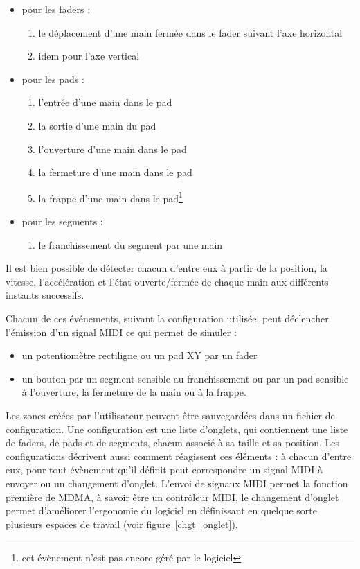 \begin{itemize}
    \item pour les faders :
        \begin{enumerate}
            \item le déplacement d'une main fermée dans le fader suivant l'axe horizontal
            \item idem pour l'axe vertical
        \end{enumerate}
    \item pour les pads :
        \begin{enumerate}
            \item l'entrée d'une main dans le pad
            \item la sortie d'une main du pad
            \item l'ouverture d'une main dans le pad
            \item la fermeture d'une main dans le pad
            \item la frappe d'une main dans le pad\footnote{cet évènement n'est pas encore géré par le logiciel}
        \end{enumerate}
    \item pour les segments :
        \begin{enumerate}
            \item le franchissement du segment par une main
        \end{enumerate}
\end{itemize}
\par Il est bien possible de détecter chacun d'entre eux à partir de la position, la vitesse, l'accélération et l'état ouverte/fermée de chaque main aux différents instants successifs.
\par Chacun de ces événements, suivant la configuration utilisée, peut déclencher l'émission d'un signal MIDI ce qui permet de simuler :
\begin{itemize}
    \item un potentiomètre rectiligne ou un pad XY par un fader
    \item un bouton par un segment sensible au franchissement ou par un pad sensible à l'ouverture, la fermeture de la main ou à la frappe.
\end{itemize}
\par Les zones créées par l'utilisateur peuvent être sauvegardées dans un fichier de configuration. Une configuration est une liste d'onglets, qui contiennent une liste de faders, de pads et de segments, chacun associé à sa taille et sa position. Les configurations décrivent aussi comment réagissent ces éléments : à chacun d'entre eux, pour tout évènement qu'il définit peut correspondre un signal MIDI à envoyer ou un changement d'onglet. L'envoi de signaux MIDI permet la fonction première de MDMA, à savoir être un contrôleur MIDI, le changement d'onglet permet d'améliorer l'ergonomie du logiciel en définissant en quelque sorte plusieurs espaces de travail (voir figure~\ref{chgt_onglet}).
